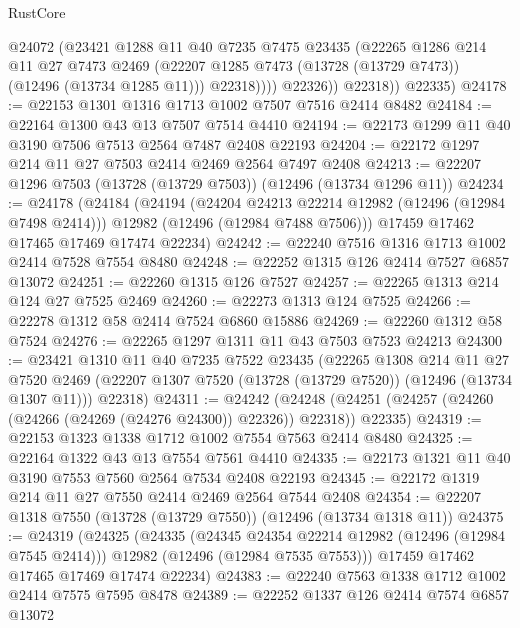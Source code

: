 \begin{lexlean}{RustCore}
\begin{coremodule}
                  @24072
                  (@23421
                    @1288
                    @11
                    @40
                    @7235
                    @7475
                    @23435
                    (@22265
                      @1286
                      @214
                      @11
                      @27
                      @7473
                      @2469
                      (@22207 @1285 @7473 (@13728 (@13729 @7473)) (@12496 (@13734 @1285 @11)))
                      @22318))))
              @22326))
          @22318))
      @22335)
@24178 := @22153 @1301 @1316 @1713 @1002 @7507 @7516 @2414 @8482
@24184 := @22164 @1300 @43 @13 @7507 @7514 @4410
@24194 := @22173 @1299 @11 @40 @3190 @7506 @7513 @2564 @7487 @2408 @22193
@24204 := @22172 @1297 @214 @11 @27 @7503 @2414 @2469 @2564 @7497 @2408
@24213 := @22207 @1296 @7503 (@13728 (@13729 @7503)) (@12496 (@13734 @1296 @11))
@24234 := @24178
    (@24184
      (@24194
        (@24204 @24213 @22214 @12982 (@12496 (@12984 @7498 @2414)))
        @12982
        (@12496 (@12984 @7488 @7506)))
      @17459
      @17462
      @17465
      @17469
      @17474
      @22234)
@24242 := @22240 @7516 @1316 @1713 @1002 @2414 @7528 @7554 @8480
@24248 := @22252 @1315 @126 @2414 @7527 @6857 @13072
@24251 := @22260 @1315 @126 @7527
@24257 := @22265 @1313 @214 @124 @27 @7525 @2469
@24260 := @22273 @1313 @124 @7525
@24266 := @22278 @1312 @58 @2414 @7524 @6860 @15886
@24269 := @22260 @1312 @58 @7524
@24276 := @22265 @1297 @1311 @11 @43 @7503 @7523 @24213
@24300 := @23421
    @1310
    @11
    @40
    @7235
    @7522
    @23435
    (@22265
      @1308
      @214
      @11
      @27
      @7520
      @2469
      (@22207 @1307 @7520 (@13728 (@13729 @7520)) (@12496 (@13734 @1307 @11)))
      @22318)
@24311 := @24242
    (@24248 (@24251 (@24257 (@24260 (@24266 (@24269 (@24276 @24300)) @22326)) @22318)) @22335)
@24319 := @22153 @1323 @1338 @1712 @1002 @7554 @7563 @2414 @8480
@24325 := @22164 @1322 @43 @13 @7554 @7561 @4410
@24335 := @22173 @1321 @11 @40 @3190 @7553 @7560 @2564 @7534 @2408 @22193
@24345 := @22172 @1319 @214 @11 @27 @7550 @2414 @2469 @2564 @7544 @2408
@24354 := @22207 @1318 @7550 (@13728 (@13729 @7550)) (@12496 (@13734 @1318 @11))
@24375 := @24319
    (@24325
      (@24335
        (@24345 @24354 @22214 @12982 (@12496 (@12984 @7545 @2414)))
        @12982
        (@12496 (@12984 @7535 @7553)))
      @17459
      @17462
      @17465
      @17469
      @17474
      @22234)
@24383 := @22240 @7563 @1338 @1712 @1002 @2414 @7575 @7595 @8478
@24389 := @22252 @1337 @126 @2414 @7574 @6857 @13072

\end{coremodule}
\end{lexlean}
